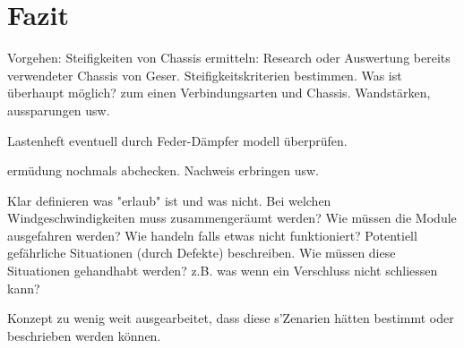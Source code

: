 
\section{Fazit}
\label{Fazit}

Vorgehen:
Steifigkeiten von Chassis ermitteln: Research oder Auswertung bereits verwendeter Chassis von Geser.
Steifigkeitskriterien bestimmen.
Was ist überhaupt möglich? zum einen Verbindungsarten und Chassis. Wandstärken, aussparungen usw.

Lastenheft eventuell durch Feder-Dämpfer modell überprüfen.

ermüdung nochmals abchecken. Nachweis erbringen usw.

Klar definieren was "erlaub" ist und was nicht. Bei welchen Windgeschwindigkeiten muss zusammengeräumt werden? Wie müssen die Module ausgefahren werden? Wie handeln falls etwas nicht funktioniert? Potentiell gefährliche Situationen (durch Defekte) beschreiben. Wie müssen diese Situationen gehandhabt werden? z.B. was wenn ein Verschluss nicht schliessen kann?

Konzept zu wenig weit ausgearbeitet, dass diese s'Zenarien hätten bestimmt oder beschrieben werden können. 
